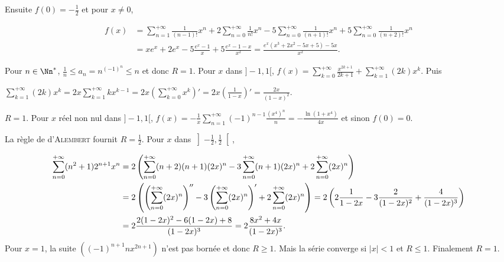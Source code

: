 {{Ensuite $f(0) = -\frac{1}{2}$  et pour $x\neq 0$,

\begin{align*}
f(x)&=\sum_{n=1}^{+\infty}\frac{1}{(n-1)!}x^n +2\sum_{n=0}^{+\infty}\frac{1}{n!}x^n- 5\sum_{n=0}^{+\infty}\frac{1}{(n+1)!}x^n+ 5\sum_{n=0}^{+\infty}\frac{1}{(n+2)!}x^n\\
 &= xe^x + 2e^x -5\frac{e^x-1}{x}+ 5\frac{e^x-1-x}{x^2}= \frac{e^x(x^3+2x^2-5x+5) -5x}{x^2}.
\end{align*}

\begin{center}
\end{center}
Pour $n\in\Nn^*$,  $\frac{1}{n}\leqslant a_n=n^{(-1)^n}\leqslant n$ et donc $R = 1$. Pour $x$ dans $]-1,1[$, $f(x)=\sum_{k=0}^{+\infty}\frac{x^{2k+1}}{2k+1}+\sum_{k=1}^{+\infty}(2k)x^k$. Puis 

\begin{center}
$\sum_{k=1}^{+\infty}(2k)x^k= 2x\sum_{k=1}^{+\infty}kx^{k-1}= 2x\left(\sum_{k=0}^{+\infty}x^k\right)'= 2x\left(\frac{1}{1-x}\right)'=\frac{2x}{(1-x)^2}$.
\end{center}

\begin{center}
\fbox{
$\forall x\in]-1,1[$, $\sum_{n=1}^{+\infty}n^{(-1)^n}x^n=\Argth x+\frac{2x}{(1-x)^2}$.
}
\end{center}
$R = 1$. Pour $x$ réel non nul dans $]-1,1[$, $f(x)=-\frac{1}{x}\sum_{n=1}^{+\infty}(-1)^{n-1}\frac{(x^4)^n}{n}= -\frac{\ln(1+x^4)}{4x}$ et sinon $f(0) = 0$.

\begin{center}
\fbox{
$\forall x\in]-1,1[$, $\sum_{n=1}^{+\infty}(-1)^n\frac{x^{4n-1}}{4n}=\left\{
\begin{array}{l}
-\frac{\ln(1+x^4)}{4x}\;\text{si}\;x\neq0\\
\rule{0mm}{4mm}0\;\text{si}\;x=0
\end{array}
\right.$.
}
\end{center}
La règle de d'\textsc{Alembert} fournit $R=\frac{1}{2}$. Pour $x$ dans $\left]-\frac{1}{2},\frac{1}{2}\right[$,

\begin{align*}\ensuremath
\sum_{n=0}^{+\infty}(n^2+1)2^{n+1}x^n&=2\left(\sum_{n=0}^{+\infty}(n+2)(n+1)(2x)^n -3\sum_{n=0}^{+\infty}(n+1)(2x)^n +2\sum_{n=0}^{+\infty}(2x)^n\right)\\
  &= 2\left(\left(\sum_{n=0}^{+\infty}(2x)^n\right)''- 3\left(\sum_{n=0}^{+\infty}(2x)^n\right)'+2\sum_{n=0}^{+\infty}(2x)^n\right)
 = 2\left(2\frac{1}{1-2x}  - 3\frac{2}{(1-2x)^2}+\frac{4}{(1-2x)^3}\right)\\
 &=2\frac{2(1-2x)^2-6(1-2x)+8}{(1-2x)^3}=2\frac{8x^2+4x}{(1-2x)^3}.
\end{align*}
Pour $x = 1$, la suite $((-1)^{n+1}nx^{2n+1})$ n'est pas bornée et donc $R\geqslant 1$. Mais la série converge si $|x| < 1$ et $R\leqslant 1$. Finalement $R=1$.

}}
